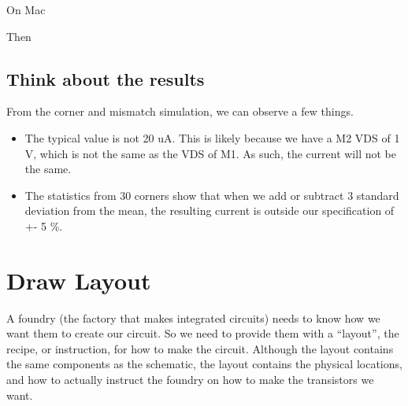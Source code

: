 \begin{Shaded}
\begin{Highlighting}[]
\end{Highlighting}
\end{Shaded}

On Mac

\begin{Shaded}
\begin{Highlighting}[]
\end{Highlighting}
\end{Shaded}

Then

\begin{Shaded}
\begin{Highlighting}[]
\end{Highlighting}
\end{Shaded}

\subsection{Think about the results}\label{think-about-the-results}

From the corner and mismatch simulation, we can observe a few things.

\begin{itemize}
\tightlist
\item
  The typical value is not 20 uA. This is likely because we have a M2
  VDS of 1 V, which is not the same as the VDS of M1. As such, the
  current will not be the same.
\item
  The statistics from 30 corners show that when we add or subtract 3
  standard deviation from the mean, the resulting current is outside our
  specification of +- 5 \%.
\end{itemize}

\section{\texorpdfstring{Draw Layout }{Draw Layout }}\label{draw-layout}

A foundry (the factory that makes integrated circuits) needs to know how
we want them to create our circuit. So we need to provide them with a
``layout'', the recipe, or instruction, for how to make the circuit.
Although the layout contains the same components as the schematic, the
layout contains the physical locations, and how to actually instruct the
foundry on how to make the transistors we want.

